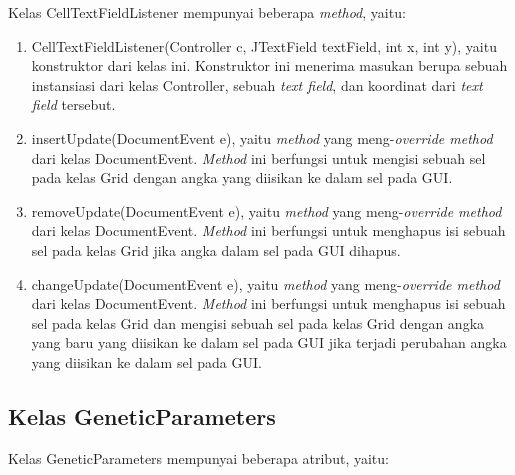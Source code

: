Kelas CellTextFieldListener mempunyai beberapa \textit{method}, yaitu:

\begin{enumerate}
\item CellTextFieldListener(Controller c, JTextField textField, int x, int y), yaitu konstruktor dari kelas ini. Konstruktor ini menerima masukan berupa sebuah instansiasi dari kelas Controller, sebuah \textit{text field}, dan koordinat dari \textit{text field} tersebut.
\item insertUpdate(DocumentEvent e), yaitu \textit{method} yang meng-\textit{override method} dari kelas DocumentEvent. \textit{Method} ini berfungsi untuk mengisi sebuah sel pada kelas Grid dengan angka yang diisikan ke dalam sel pada GUI.
\item removeUpdate(DocumentEvent e), yaitu \textit{method} yang meng-\textit{override method} dari kelas DocumentEvent. \textit{Method} ini berfungsi untuk menghapus isi sebuah sel pada kelas Grid jika angka dalam sel pada GUI dihapus.
\item changeUpdate(DocumentEvent e), yaitu \textit{method} yang meng-\textit{override method} dari kelas DocumentEvent. \textit{Method} ini berfungsi untuk menghapus isi sebuah sel pada kelas Grid dan mengisi sebuah sel pada kelas Grid dengan angka yang baru yang diisikan ke dalam sel pada GUI jika terjadi perubahan angka yang diisikan ke dalam sel pada GUI.
\end{enumerate}

\subsection{Kelas GeneticParameters}
\label{sec:kelasgeneticparamater}

Kelas GeneticParameters mempunyai beberapa atribut, yaitu:

